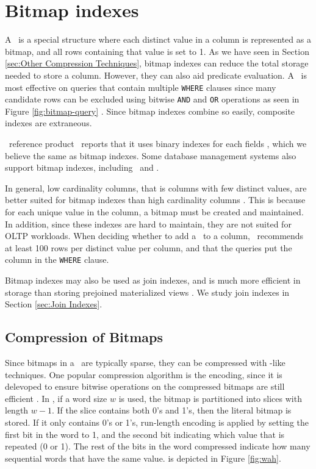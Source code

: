 \section{Bitmap indexes}
\label{sec:Bitmap indexes}
A \biti~is a special structure where each distinct value in a column is represented as a bitmap, and all rows containing that value is set to 1. As we have seen in Section \ref{sec:Other Compression Techniques}, bitmap indexes can reduce the total storage needed to store a column. However, they can also aid predicate evaluation. A \biti~is most effective on queries that contain multiple \texttt{WHERE} clauses since many candidate rows can be excluded using bitwise \texttt{AND} and \texttt{OR} operations as seen in Figure \ref{fig:bitmap-query} \cite{noauthor_undated-hp}. Since bitmap indexes combine so easily, composite indexes are extraneous.

\genusSoftware~reference product \qlikview~reports that it uses binary indexes for each fields \cite{Qlik2011-ef}, which we believe the same as bitmap indexes. Some database management systems also support bitmap indexes, including \oracle~and \ibm.

In general, low cardinality columns, that is columns with few distinct values, are better suited for bitmap indexes than high cardinality columns \cite{noauthor_undated-hp}. This is because for each unique value in the column, a bitmap must be created and maintained. In addition, since these indexes are hard to maintain, they are not suited for OLTP workloads. When deciding whether to add a \biti~to a column, \oracle~recommends at least 100 rows per distinct value per column, and that the queries put the column in the \texttt{WHERE} clause.

Bitmap indexes may also be used as join indexes, and is much more efficient in storage than storing prejoined materialized views \cite{noauthor_undated-hp}. We study join indexes in Section \ref{sec:Join Indexes}.


\subsection{Compression of Bitmaps}
\label{sub:Compression of Bitmaps}
Since bitmaps in a \biti~are typically sparse, they can be compressed with \rle-like techniques. One popular compression algorithm is the  encoding, since it is delevoped to ensure bitwise operations on the compressed bitmaps are still efficient \cite{Bjorklund2011-wh}. In , if a word size $w$ is used, the bitmap is partitioned into slices with length $w-1$. If the slice contains both 0's and 1's, then the literal bitmap is stored. If it only contains 0's or 1's, run-length encoding is applied by setting the first bit in the word to 1, and the second bit indicating which value that is repeated (0 or 1). The rest of the bits in the word compressed indicate how many sequential words that have the same value.  is depicted in Figure \ref{fig:wah}.

